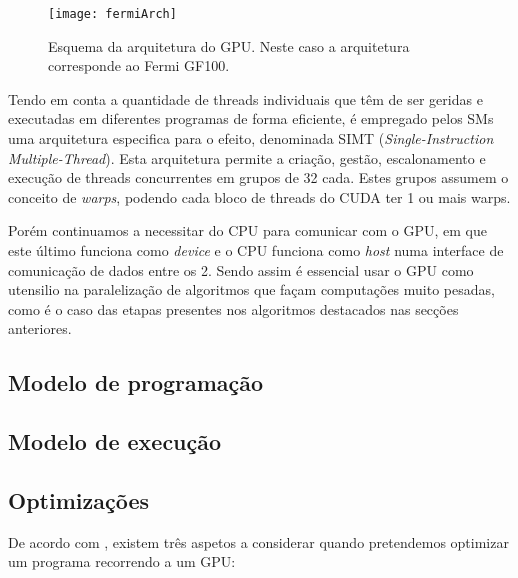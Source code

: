   \begin{figure}[ht]
  \centering
    {\texttt{[image: fermiArch]}}
  \caption{Esquema da arquitetura do GPU. Neste caso a arquitetura corresponde ao Fermi GF100. \cite{wittenbrink2011fermi}}
  \label{fig:fig2subfig}
\end{figure}

Tendo em conta a quantidade de threads individuais que têm de ser geridas e executadas em diferentes programas de forma eficiente, é empregado pelos SMs uma arquitetura especifica para o efeito, denominada SIMT (\textit{Single-Instruction Multiple-Thread}). \cite{nvidiaTesla}
Esta arquitetura permite a criação, gestão, escalonamento e execução de threads concurrentes em grupos de 32 cada. Estes grupos assumem o conceito de \textit{warps}, podendo cada bloco de threads do CUDA ter 1 ou mais warps.
\cite{gpuComputingEra}


Porém continuamos a necessitar do CPU para comunicar com o GPU, em que este último funciona como \textit{device} e o CPU funciona como \textit{host} numa interface de comunicação de dados entre os 2.
Sendo assim é essencial usar o GPU como utensilio na paralelização de algoritmos que façam computações muito pesadas, como é o caso das etapas presentes nos algoritmos destacados nas secções anteriores.
\subsection{Modelo de programação}
\cite{optimization}
\subsection{Modelo de execução}
\cite{optimization}

\subsection{Optimizações}
De acordo com \cite{optimization}, existem três aspetos a considerar quando pretendemos optimizar um programa recorrendo a um GPU:

